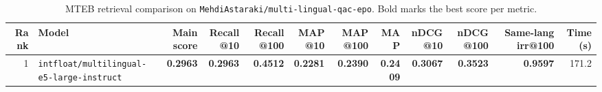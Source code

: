 \begin{table}[t]
\centering
\small
\begin{tabular}{r l r r r r r r r r r r}
\hline
Rank & Model & Main score & Recall@10 & Recall@100 & MAP@10 & MAP@100 & MAP & nDCG@10 & nDCG@100 & Same-lang irr@100 & Time (s) \\
\hline
1 & \texttt{intfloat/multilingual-e5-large-instruct} & \textbf{0.2963} & \textbf{0.2963} & \textbf{0.4512} & \textbf{0.2281} & \textbf{0.2390} & \textbf{0.2409} & \textbf{0.3067} & \textbf{0.3523} & \textbf{0.9597} & 171.2 \\
\hline
\end{tabular}
\caption{MTEB retrieval comparison on \texttt{MehdiAstaraki/multi-lingual-qac-epo}. Bold marks the best score per metric.}
\label{tab:mteb-model-comparison}
\end{table}
